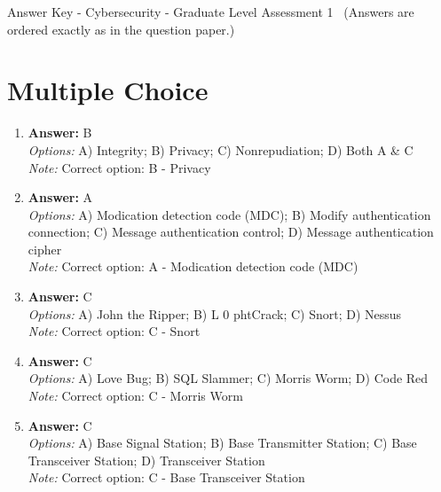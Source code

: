 \documentclass[12pt]{article}
\begin{document}
\begin{center}
Answer Key - Cybersecurity - Graduate Level Assessment 1 \
\small (Answers are ordered exactly as in the question paper.)
\end{center}

\section*{Multiple Choice}
\begin{enumerate}[label=\arabic*.]
\item \textbf{Answer:} B
\\ \textit{Options:} A) Integrity; B) Privacy; C) Nonrepudiation; D) Both A \& C
\\ \textit{Note:} Correct option: B - Privacy
\item \textbf{Answer:} A
\\ \textit{Options:} A) Modication detection code (MDC); B) Modify authentication connection; C) Message authentication control; D) Message authentication cipher
\\ \textit{Note:} Correct option: A - Modication detection code (MDC)
\item \textbf{Answer:} C
\\ \textit{Options:} A) John the Ripper; B) L 0 phtCrack; C) Snort; D) Nessus
\\ \textit{Note:} Correct option: C - Snort
\item \textbf{Answer:} C
\\ \textit{Options:} A) Love Bug; B) SQL Slammer; C) Morris Worm; D) Code Red
\\ \textit{Note:} Correct option: C - Morris Worm
\item \textbf{Answer:} C
\\ \textit{Options:} A) Base Signal Station; B) Base Transmitter Station; C) Base Transceiver Station; D) Transceiver Station
\\ \textit{Note:} Correct option: C - Base Transceiver Station
\end{enumerate}
\end{document}

